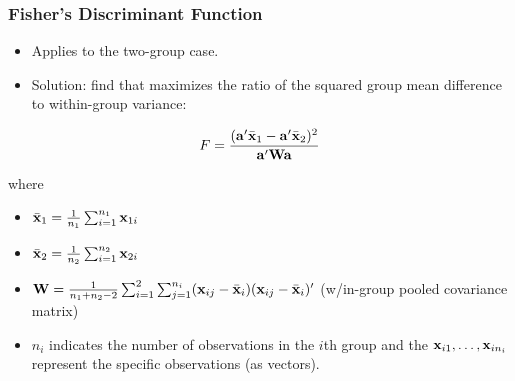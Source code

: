 \documentclass{beamer}
\begin{document}
\begin{frame}
  \frametitle{Fisher's Discriminant Function}

\begin{itemize}
\item Applies to the two-group case.
\item Solution: find  that maximizes the ratio of the squared group mean difference to within-group variance:
\end{itemize}

\[
F = \frac{(\mathbf{a}'\bar{\mathbf{x}}_1 - \mathbf{a}'\bar{\mathbf{x}}_2)^2}{\mathbf{a}'\mathbf{W}\mathbf{a}}
\]

where
\begin{itemize}
\item $\bar{\mathbf{x}}_1 = \frac{1}{n_1}\sum_{i=1}^{n_1} \mathbf{x}_{1i}$
\item $\bar{\mathbf{x}}_2 = \frac{1}{n_2}\sum_{i=1}^{n_2} \mathbf{x}_{2i}$
\item $\mathbf{W} = \frac{1}{n_1 + n_2 - 2}\sum_{i=1}^{2}\sum_{j=1}^{n_i}(\mathbf{x}_{ij} - \bar{\mathbf{x}}_i)(\mathbf{x}_{ij} - \bar{\mathbf{x}}_i)'$ (w/in-group pooled covariance matrix)
\item $n_i$ indicates the number of observations in the $i$th group and the $\mathbf{x}_{i1},\ldots,\mathbf{x}_{in_i}$ represent the specific observations (as vectors).
\end{itemize}

%
%
%
%

\end{frame}

\end{document}
